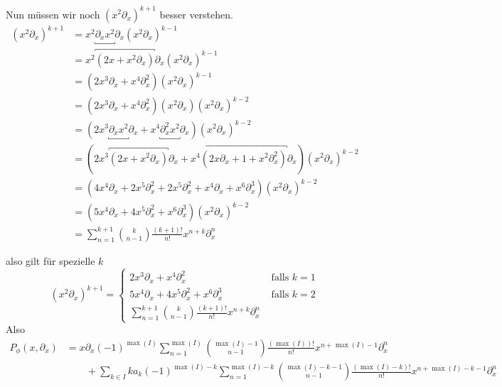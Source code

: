 Nun müssen wir noch $(x^2\partial_x)^{k+1}$ besser verstehen.
\begin{align*}
(x^2\partial_x)^{k+1} &=x^2\underbracket{\partial_xx^2}\partial_x
                        (x^2\partial_x)^{k-1}\\
                      &=x^2\overbracket{(2x+x^{2}\partial_x)}\partial_x
                        (x^2\partial_x)^{k-1}\\
                      &=(2x^3\partial_x+x^{4}\partial_x^2)
                        (x^2\partial_x)^{k-1}\\
                      &=(2x^3\partial_x+x^{4}\partial_x^2)(x^2\partial_x)
                        (x^2\partial_x)^{k-2}\\
                      &=(2x^3\underbracket{\partial_xx^2}\partial_x
                        +x^{4}\underbracket{\partial_x^2x^2}\partial_x)
                        (x^2\partial_x)^{k-2}\\
                      &=(2x^3\overbracket{(2x+x^{2}\partial_x)}\partial_x
                        +x^{4}\overbracket{(2x\partial_x+1+x^2\partial_x^2)}
                        \partial_x) (x^2\partial_x)^{k-2}\\
                      &=(4x^4\partial_x+2x^{5}\partial_x^2
                        +2x^{5}\partial_x^2
                        +x^4\partial_x
                        +x^6\partial_x^3)
                        (x^2\partial_x)^{k-2}\\
                      &=(5x^4\partial_x+4x^{5}\partial_x^2
                        +x^6\partial_x^3)
                        (x^2\partial_x)^{k-2}\\
                      &=\sum_{n=1}^{k+1}\binom{k}{n-1}\frac{(k+1)!}{n!}x^{n+k}
                        \partial_x^{n}
\end{align*}
\begin{comment}
Stirlingzahlen
\end{comment}
also gilt für spezielle $k$
\begin{equation} \label{eq:rezeptNeben1}
(x^2\partial_x)^{k+1}=
\begin{cases}
  2x^3\partial_x+x^{4}\partial_x^2 & \mbox{ falls } k=1\\
  5x^4\partial_x+4x^{5}\partial_x^2 +x^6\partial_x^3 & \mbox{ falls } k=2\\
  \sum_{n=1}^{k+1}\binom{k}{n-1}\frac{(k+1)!}{n!}x^{n+k} \partial_x^{n}
\end{cases}
\end{equation}
Also
\begin{align*}
P_{\phi}(x,\partial_x)
  &=x\partial_x(-1)^{\max(I)}
    \sum_{n=1}^{\max(I)}\binom{\max(I)-1}{n-1}
    \frac{(\max(I))!}{n!}x^{n+\max(I)-1} \partial_x^{n}\\
  &\qquad+\sum_{k\in I}k a_k(-1)^{\max(I)-k}
    \sum_{n=1}^{\max(I)-k}\binom{\max(I)-k-1}{n-1}
    \frac{(\max(I)-k)!}{n!}x^{n+\max(I)-k-1} \partial_x^{n}
\end{align*}

